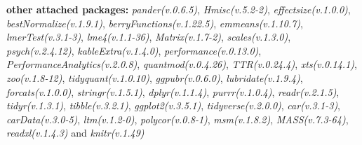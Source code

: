 \documentclass[
  bookmarksnumbered]{article}
\begin{document}
\textbf{other attached packages:}
\emph{pander(v.0.6.5)}, \emph{Hmisc(v.5.2-2)}, \emph{effectsize(v.1.0.0)}, \emph{bestNormalize(v.1.9.1)}, \emph{berryFunctions(v.1.22.5)}, \emph{emmeans(v.1.10.7)}, \emph{lmerTest(v.3.1-3)}, \emph{lme4(v.1.1-36)}, \emph{Matrix(v.1.7-2)}, \emph{scales(v.1.3.0)}, \emph{psych(v.2.4.12)}, \emph{kableExtra(v.1.4.0)}, \emph{performance(v.0.13.0)}, \emph{PerformanceAnalytics(v.2.0.8)}, \emph{quantmod(v.0.4.26)}, \emph{TTR(v.0.24.4)}, \emph{xts(v.0.14.1)}, \emph{zoo(v.1.8-12)}, \emph{tidyquant(v.1.0.10)}, \emph{ggpubr(v.0.6.0)}, \emph{lubridate(v.1.9.4)}, \emph{forcats(v.1.0.0)}, \emph{stringr(v.1.5.1)}, \emph{dplyr(v.1.1.4)}, \emph{purrr(v.1.0.4)}, \emph{readr(v.2.1.5)}, \emph{tidyr(v.1.3.1)}, \emph{tibble(v.3.2.1)}, \emph{ggplot2(v.3.5.1)}, \emph{tidyverse(v.2.0.0)}, \emph{car(v.3.1-3)}, \emph{carData(v.3.0-5)}, \emph{ltm(v.1.2-0)}, \emph{polycor(v.0.8-1)}, \emph{msm(v.1.8.2)}, \emph{MASS(v.7.3-64)}, \emph{readxl(v.1.4.3)} and \emph{knitr(v.1.49)}
\end{document}
